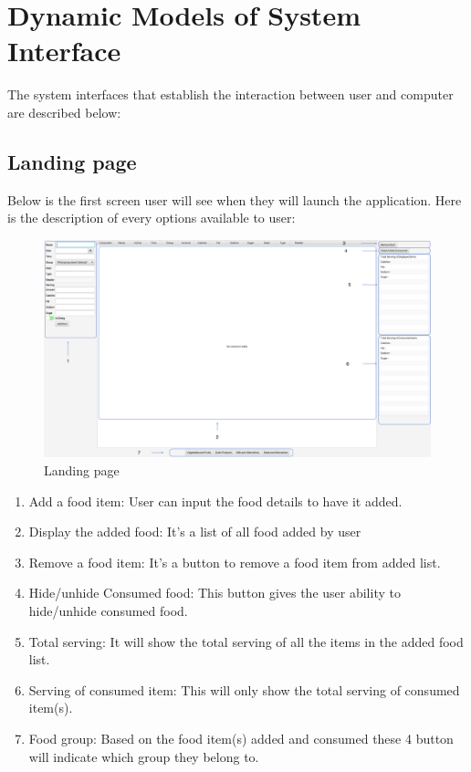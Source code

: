 \documentclass{scrreprt}
\begin{document}
\section{Dynamic Models of System Interface}
The system interfaces that establish the interaction between user and computer are described below:

\clearpage

\subsection{Landing page}
Below is the first screen user will see when they will launch the application. Here is the description of every options available to user:

\begin{figure}[!htbp]
\centering
\includegraphics[width=15cm]{pictures/raw.png}
\caption*{Landing page}
\end{figure}
\FloatBarrier
\begin{enumerate}
\item Add a food item: User can input the food details to have it added.
\item Display the added food: It's a list of all food added by user
\item Remove a food item: It's a button to remove a food item from added list.
\item Hide/unhide Consumed food: This button gives the user ability to hide/unhide consumed food.
\item Total serving: It will show the total serving of all the items in the added food list.
\item Serving of consumed item: This will only show the total serving of consumed item(s).
\item Food group: Based on the food item(s) added and consumed these 4 button will indicate which group they belong to.
\end{enumerate}
	
\end{document}
